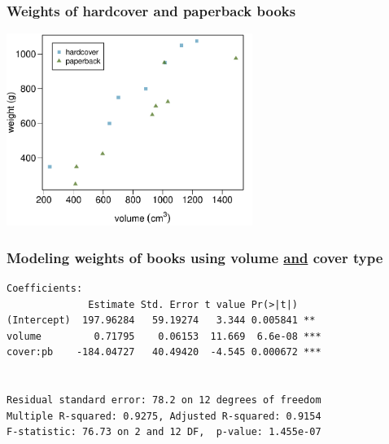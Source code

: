 
\begin{frame}
\frametitle{Weights of hardcover and paperback books}



\begin{center}
\includegraphics[width=0.6\textwidth]{9-1_intro_mlr/figures/books/weight_volume_cover}
\end{center}

\end{frame}


\begin{frame}[fragile]
\frametitle{Modeling weights of books using volume \underline{and} cover type}

\begin{verbatim}
Coefficients:
              Estimate Std. Error t value Pr(>|t|)    
(Intercept)  197.96284   59.19274   3.344 0.005841 ** 
volume         0.71795    0.06153  11.669  6.6e-08 ***
cover:pb    -184.04727   40.49420  -4.545 0.000672 ***


Residual standard error: 78.2 on 12 degrees of freedom
Multiple R-squared: 0.9275,	Adjusted R-squared: 0.9154 
F-statistic: 76.73 on 2 and 12 DF,  p-value: 1.455e-07 
\end{verbatim}

\end{frame}


